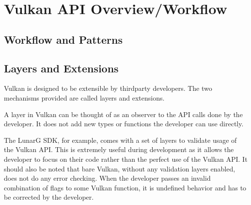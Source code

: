 
\chapter{Vulkan API Overview/Workflow}
\label{cha:VulkanOverview}


  \lipsum

  \section{Workflow and Patterns}
  \label{sec:WorkflowAndPatterns}
    \lipsum

  \section{Layers and Extensions}

    Vulkan is designed to be extensible by thirdparty developers. The two mechanisms provided are called layers and extensions.

    A layer in Vulkan can be thought of as an observer to the API calls done by the developer. It does not add new types or functions the developer can use directly.

    The LunarG SDK, for example, comes with a set of layers to validate usage of the Vulkan API. This is extremely useful during development as it allows the developer to focus on their code rather than the perfect use of the Vulkan API. It should also be noted that bare Vulkan, without any validation layers enabled, does not do any error checking. When the developer passes an invalid combination of flags to some Vulkan function, it is undefined behavior and has to be corrected by the developer.

